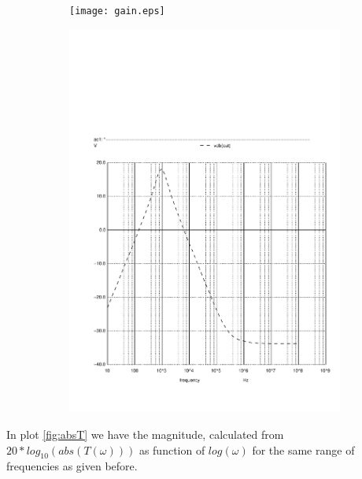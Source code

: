 \begin{figure}[h]
  \centering
  \begin{subfigure}{0.5\textwidth}
      \texttt{[image: gain.eps]}
      \label{fig:output1}
  \end{subfigure}
  \begin{subfigure}{0.4\textwidth}
      \includegraphics[width=\linewidth, clip]{gain.pdf}
      \label{fig:output2}
  \end{subfigure}
  \caption{\small }
  \label{output_deviation}
\end{figure}


In plot \ref{fig:absT} we have the magnitude, calculated from $20*log_{10}(abs(T(\omega)))$ as function of $log(\omega)$ for the same range of frequencies as given before.


